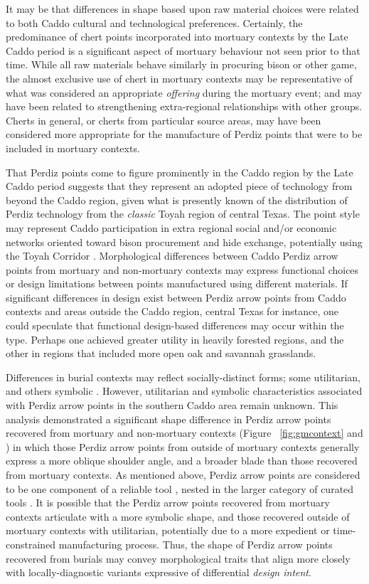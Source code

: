 \documentclass[review]{elsarticle}
\begin{document}
It may be that differences in shape based upon raw material choices were related to both Caddo cultural and technological preferences. Certainly, the predominance of chert points incorporated into mortuary contexts by the Late Caddo period is a significant aspect of mortuary behaviour not seen prior to that time. While all raw materials behave similarly in procuring bison or other game, the almost exclusive use of chert in mortuary contexts may be representative of what was considered an appropriate \textit{offering} during the mortuary event; and may have been related to strengthening extra-regional relationships with other groups. Cherts in general, or cherts from particular source areas, may have been considered more appropriate for the manufacture of Perdiz points that were to be included in mortuary contexts.  

That Perdiz points come to figure prominently in the Caddo region by the Late Caddo period suggests that they represent an adopted piece of technology from beyond the Caddo region, given what is presently known of the distribution of Perdiz technology from the \textit{classic} Toyah region of central Texas. The point style may represent Caddo participation in extra regional social and/or economic networks oriented toward bison procurement and hide exchange, potentially using the Toyah Corridor \citep{RN9002,RN9011}. Morphological differences between Caddo Perdiz arrow points from mortuary and non-mortuary contexts may express functional choices or design limitations between points manufactured using different materials. If significant differences in design exist between Perdiz arrow points from Caddo contexts and areas outside the Caddo region, central Texas for instance, one could speculate that functional design-based differences may occur within the type. Perhaps one achieved greater utility in heavily forested regions, and the other in regions that included more open oak and savannah grasslands.

Differences in burial contexts may reflect socially-distinct forms; some utilitarian, and others symbolic \citep[69]{RN8989}. However, utilitarian and symbolic characteristics associated with Perdiz arrow points in the southern Caddo area remain unknown. This analysis demonstrated a significant shape difference in Perdiz arrow points recovered from mortuary and non-mortuary contexts (Figure ~\ref{fig:gmcontext} and \citealt{RN8980}) in which those Perdiz arrow points from outside of mortuary contexts generally express a more oblique shoulder angle, and a broader blade than those recovered from mortuary contexts. As mentioned above, Perdiz arrow points are considered to be one component of a reliable tool \citep{RN5873}, nested in the larger category of curated tools \citep{RN5880}. It is possible that the Perdiz arrow points recovered from mortuary contexts articulate with a more symbolic shape, and those recovered outside of mortuary contexts with utilitarian, potentially due to a more expedient or time-constrained manufacturing process. Thus, the shape of Perdiz arrow points recovered from burials may convey morphological traits that align more closely with locally-diagnostic variants expressive of differential \textit{design intent}.
\end{document}
